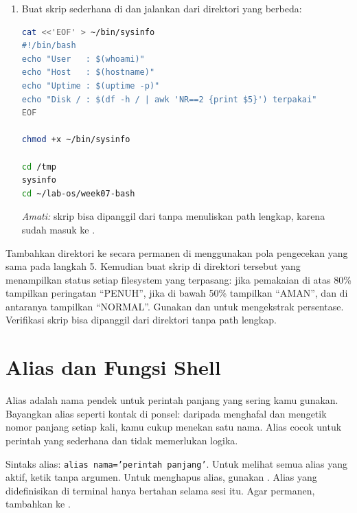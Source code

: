 \begin{enumerate}
    \item Buat skrip sederhana di  dan jalankan dari direktori
          yang berbeda:
\begin{lstlisting}[language=bash, caption={Membuat dan menguji skrip di ~/bin}]
cat <<'EOF' > ~/bin/sysinfo
#!/bin/bash
echo "User   : $(whoami)"
echo "Host   : $(hostname)"
echo "Uptime : $(uptime -p)"
echo "Disk / : $(df -h / | awk 'NR==2 {print $5}') terpakai"
EOF

chmod +x ~/bin/sysinfo

cd /tmp
sysinfo
cd ~/lab-os/week07-bash
\end{lstlisting}
    \textit{Amati:} skrip  bisa dipanggil dari 
    tanpa menuliskan path lengkap, karena  sudah masuk ke
    .
\end{enumerate}

\begin{challengebox}
Tambahkan direktori  ke  secara
permanen di  menggunakan pola pengecekan yang sama pada
langkah 5. Kemudian buat skrip  di direktori tersebut yang
menampilkan status setiap filesystem yang terpasang: jika pemakaian di atas
80\% tampilkan peringatan ``PENUH'', jika di bawah 50\% tampilkan ``AMAN'',
dan di antaranya tampilkan ``NORMAL''. Gunakan  dan 
untuk mengekstrak persentase. Verifikasi skrip bisa dipanggil dari
direktori  tanpa path lengkap.
\end{challengebox}

\section{Alias dan Fungsi Shell}
\label{sec:alias-fungsi-shell}

Alias adalah nama pendek untuk perintah panjang yang sering kamu gunakan.
Bayangkan alias seperti kontak di ponsel: daripada menghafal dan mengetik
nomor panjang setiap kali, kamu cukup menekan satu nama. Alias cocok untuk
perintah yang sederhana dan tidak memerlukan logika.

Sintaks alias: \texttt{alias nama='perintah panjang'}. Untuk melihat semua
alias yang aktif, ketik  tanpa argumen. Untuk menghapus alias,
gunakan . Alias yang didefinisikan di terminal hanya
bertahan selama sesi itu. Agar permanen, tambahkan ke .

